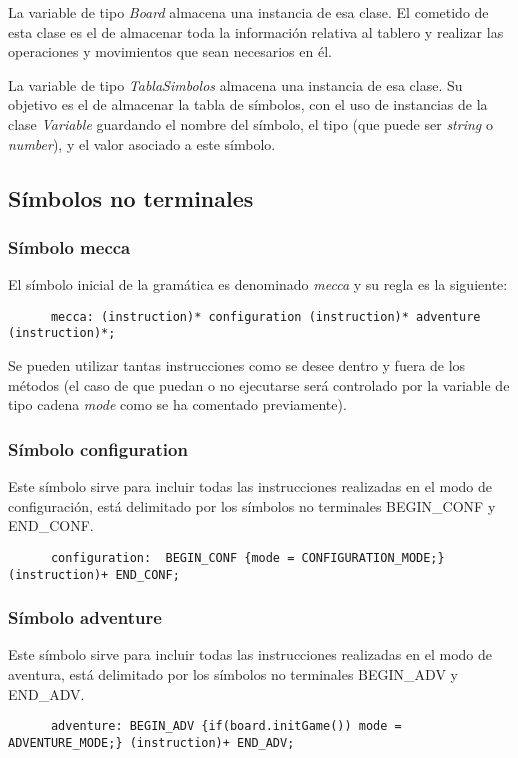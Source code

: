 \documentclass[a4paper,12pt,twoside,openright]{report}
\begin{document}
    La variable de tipo \emph{Board} almacena una instancia de esa clase. El cometido de esta clase es el de almacenar toda 
    la información relativa al tablero y realizar las operaciones y movimientos que sean necesarios en él.
    
    La variable de tipo \emph{TablaSimbolos} almacena una instancia de esa clase. Su objetivo es el de almacenar la tabla de 
    símbolos, con el uso de instancias de la clase \emph{Variable} guardando el nombre del símbolo, el tipo (que puede ser 
    \emph{string} o \emph{number}), y el valor asociado a este símbolo.

    
    \subsection{Símbolos no terminales}
      \subsubsection{Símbolo mecca}
      El símbolo inicial de la gramática es denominado \emph{mecca} y su regla es la siguiente:
      \begin{lstlisting}
      mecca: (instruction)* configuration (instruction)* adventure (instruction)*;
      \end{lstlisting}
      
      Se pueden utilizar tantas instrucciones como se desee dentro y fuera de los métodos (el caso de que puedan o no 
      ejecutarse será controlado por la variable de tipo cadena \emph{mode} como se ha comentado previamente).

      \subsubsection{Símbolo configuration}
      Este símbolo sirve para incluir todas las instrucciones realizadas en el modo de configuración, está delimitado por 
      los símbolos no terminales BEGIN\_CONF y END\_CONF.
      \begin{lstlisting}
      configuration:  BEGIN_CONF {mode = CONFIGURATION_MODE;} (instruction)+ END_CONF;
      \end{lstlisting}
      
      \subsubsection{Símbolo adventure}
      Este símbolo sirve para incluir todas las instrucciones realizadas en el modo de aventura, está delimitado por 
      los símbolos no terminales BEGIN\_ADV y END\_ADV.
      \begin{lstlisting}
      adventure: BEGIN_ADV {if(board.initGame()) mode = ADVENTURE_MODE;} (instruction)+ END_ADV;
      \end{lstlisting}
      
\end{document}
